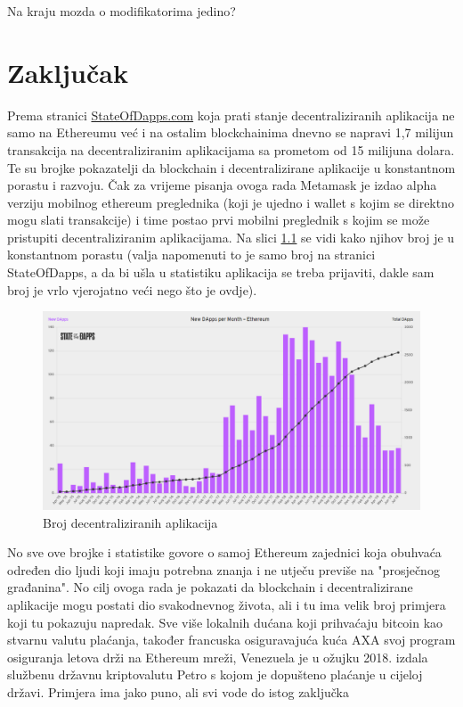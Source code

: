 \documentclass[12pt]{report}
\begin{document}
Na kraju mozda o modifikatorima jedino?

\chapter{Zaključak}

Prema stranici \href{https://www.stateofthedapps.com/}{StateOfDapps.com} koja prati stanje decentraliziranih aplikacija ne samo na Ethereumu već i na ostalim blockchainima dnevno se napravi 1,7 milijun transakcija na decentraliziranim aplikacijama sa prometom od 15 milijuna dolara. Te su brojke pokazatelji da blockchain i decentralizirane aplikacije u konstantnom porastu i razvoju. Čak za vrijeme pisanja ovoga rada Metamask je izdao alpha verziju mobilnog ethereum preglednika (koji je ujedno i wallet s kojim se direktno mogu slati transakcije) i time postao prvi mobilni preglednik s kojim se može pristupiti decentraliziranim aplikacijama. Na slici \ref{fig:stats} se vidi kako njihov broj je u konstantnom porastu (valja napomenuti to je samo broj na stranici StateOfDapps, a da bi ušla u statistiku aplikacija se treba prijaviti, dakle sam broj je vrlo vjerojatno veći nego što je ovdje).

\begin{figure}[H]
\centering
\includegraphics[scale=0.33]{dapps_stats}
\caption{Broj decentraliziranih aplikacija}
\label{fig:stats}
\end{figure}

No sve ove brojke i statistike govore o samoj Ethereum zajednici koja obuhvaća određen dio ljudi koji imaju potrebna znanja i ne utječu previše na "prosječnog građanina". No cilj ovoga rada je pokazati da blockchain i decentralizirane aplikacije mogu postati dio svakodnevnog života, ali i tu ima velik broj primjera koji tu pokazuju napredak. Sve više lokalnih dućana koji prihvaćaju bitcoin kao stvarnu valutu plaćanja, također francuska osiguravajuća kuća AXA svoj program osiguranja letova drži na Ethereum mreži\cite{axa}, Venezuela je u ožujku 2018. izdala službenu državnu kriptovalutu Petro s kojom je dopušteno plaćanje u cijeloj državi. Primjera ima jako puno, ali svi vode do istog zaključka 

\printbibliography
\end{document}
